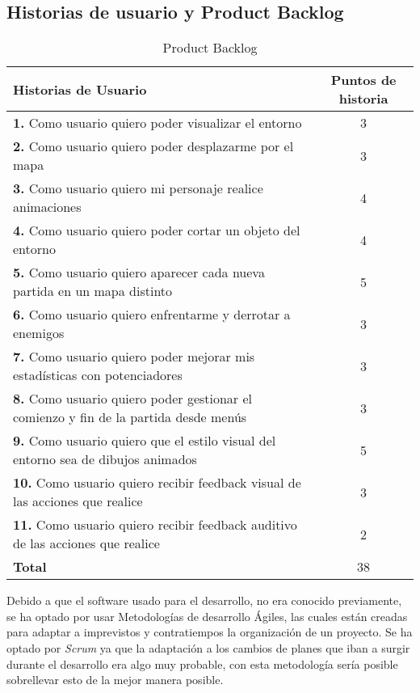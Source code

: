 \subsection{Historias de usuario y Product Backlog}

\begin{table}[H]
    \centering
    \begin{tabular}{|p{10cm}|c|}
      \hline
      \textbf{Historias de Usuario} & \textbf{Puntos de historia} \\
      \hline
      \textbf{1.} Como usuario quiero poder visualizar el entorno  & 3 \\
      \textbf{2.} Como usuario quiero poder desplazarme por el mapa & 3 \\
      \textbf{3.} Como usuario quiero mi personaje realice animaciones  & 4 \\
      \textbf{4.} Como usuario quiero poder cortar un objeto del entorno & 4 \\
      \textbf{5.} Como usuario quiero aparecer cada nueva partida en un mapa distinto & 5 \\
      \textbf{6.} Como usuario quiero enfrentarme y derrotar a enemigos & 3 \\
      \textbf{7.} Como usuario quiero poder mejorar mis estadísticas con potenciadores & 3 \\
      \textbf{8.} Como usuario quiero poder gestionar el comienzo y fin de la partida desde menús & 3 \\
      \textbf{9.} Como usuario quiero que el estilo visual del entorno sea de dibujos animados & 5 \\
      \textbf{10.} Como usuario quiero recibir feedback visual de las acciones que realice & 3 \\
      \textbf{11.} Como usuario quiero recibir feedback auditivo de las acciones que realice & 2 \\
      \hline
                                     \textbf{Total} & 38 \\
      \hline
    \end{tabular}
    \caption{Product Backlog}
    \label{tab:historias}
  \end{table}

Debido a que el software usado para el desarrollo, no era conocido previamente, se ha optado por usar Metodologías de desarrollo Ágiles, las cuales están creadas para adaptar a imprevistos y contratiempos la organización de un proyecto. Se ha optado por \textit{Scrum} ya que la adaptación a los cambios de planes que iban a surgir durante el desarrollo era algo muy probable, con esta metodología sería posible sobrellevar esto de la mejor manera posible.

